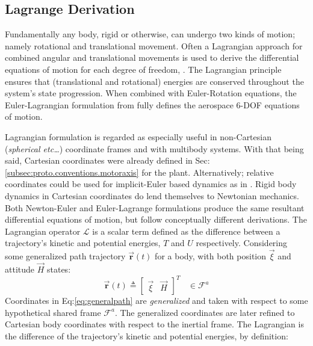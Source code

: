 \subsection{Lagrange Derivation}
\label{subsec:dynamics.rigidbody.lagrange}
Fundamentally any body, rigid or otherwise, can undergo two kinds of motion; namely rotational and translational movement. Often a Lagrangian approach for combined angular and translational movements is used to derive the differential equations of motion for each degree of freedom, \cite{classicaldynamics}. The Lagrangian principle ensures that (translational and rotational) energies are conserved throughout the system's state progression. When combined with Euler-Rotation equations, the Euler-Lagrangian formulation from \cite{lagrange-formalism} fully defines the aerospace 6-DOF equations of motion.
\par
Lagrangian formulation is regarded as especially useful in non-Cartesian (\emph{spherical etc\ldots}) coordinate frames and with multibody systems. With that being said, Cartesian coordinates were already defined in Sec:\ref{subsec:proto.conventions.motoraxis} for the plant. Alternatively; relative coordinates could be used for implicit-Euler based dynamics as in \cite{autonomousrobotseuler}. Rigid body dynamics in Cartesian coordinates do lend themselves to Newtonian mechanics. Both Newton-Euler and Euler-Lagrange formulations produce the same resultant differential equations of motion, but follow conceptually different derivations. The Lagrangian operator $\mathcal{L}$ is a scalar term defined as the difference between a trajectory's kinetic and potential energies, $T$ and $U$ respectively. Considering some generalized path trajectory $\vec{\mathbf{r}}(t)$ for a body, with both position $\vec{\xi}$ and attitude $\vec{H}$ states:
\begin{equation}\label{eq:generalpath}
\vec{\mathbf{r}}(t)\triangleq\begin{bmatrix}
\vec{\xi} & \vec{H}
\end{bmatrix}^T~~~~\in\mathcal{F}^{a}
\end{equation}
Coordinates in Eq:\ref{eq:generalpath} are \emph{generalized} and taken with respect to some hypothetical shared frame $\mathcal{F}^{a}$. The generalized coordinates are later refined to Cartesian body coordinates with respect to the inertial frame. The Lagrangian is the difference of the trajectory's kinetic and potential energies, by definition:
